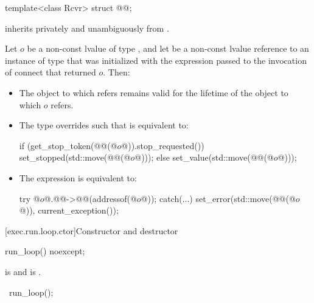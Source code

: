 \begin{itemdecl}
template<class Rcvr>
  struct @@;
\end{itemdecl}

\pnum
{}
inherits privately and unambiguously from .

\pnum
Let $o$ be a non-const lvalue of type ,
and let  be a non-const lvalue reference to an instance of type 
that was initialized with the expression 
passed to the invocation of connect that returned $o$.
Then:
\begin{itemize}
\item
The object to which  refers
remains valid for the lifetime of the object to which $o$ refers.
\item
The type  overrides
such that  is equivalent to:
\begin{codeblock}
if (get_stop_token(@@(@$o$@)).stop_requested()) {
  set_stopped(std::move(@@(@$o$@)));
} else {
  set_value(std::move(@@(@$o$@)));
}
\end{codeblock}
\item
The expression  is equivalent to:
\begin{codeblock}
try {
  @$o$@.@@->@@(addressof(@$o$@));
} catch(...) {
  set_error(std::move(@@(@$o$@)), current_exception());
}
\end{codeblock}
\end{itemize}

[exec.run.loop.ctor]{Constructor and destructor}

%
\begin{itemdecl}
run_loop() noexcept;
\end{itemdecl}

\begin{itemdescr}
\pnum
\ensures
{} is  and  is .
\end{itemdescr}

%
\begin{itemdecl}
~run_loop();
\end{itemdecl}

